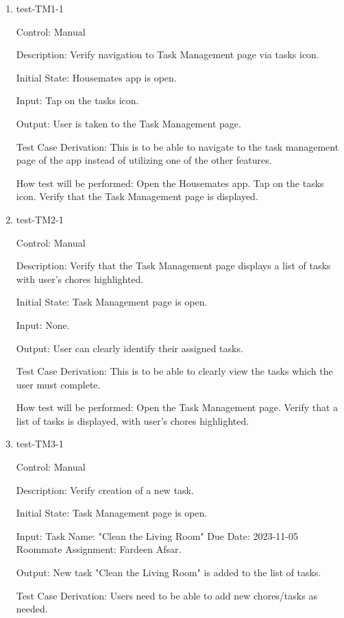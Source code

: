 \documentclass[12pt, titlepage]{article}
\begin{document}
\begin{enumerate}

\item{test-TM1-1\\}

Control: Manual

Description: Verify navigation to Task Management page via tasks icon.
					
Initial State: Housemates app is open.
					
Input: Tap on the tasks icon.
					
Output: User is taken to the Task Management page.

Test Case Derivation: This is to be able to navigate to the task management page of the app instead of utilizing one of the other features.
					
How test will be performed: 
Open the Housemates app.
Tap on the tasks icon.
Verify that the Task Management page is displayed.
					
\item{test-TM2-1\\}

Control: Manual

Description: Verify that the Task Management page displays a list of tasks with user's chores highlighted.
					
Initial State: Task Management page is open.
					
Input: None.
					
Output: User can clearly identify their assigned tasks.

Test Case Derivation: This is to be able to clearly view the tasks which the user must complete.

How test will be performed: 
Open the Task Management page.
Verify that a list of tasks is displayed, with user's chores highlighted.

\item{test-TM3-1\\}

Control: Manual

Description: Verify creation of a new task.
					
Initial State: Task Management page is open.
					
Input: Task Name: "Clean the Living Room"
Due Date: 2023-11-05
Roommate Assignment: Fardeen Afsar.
					
Output: New task "Clean the Living Room" is added to the list of tasks.

Test Case Derivation: Users need to be able to add new chores/tasks as needed.


\end{enumerate}
\end{document}
